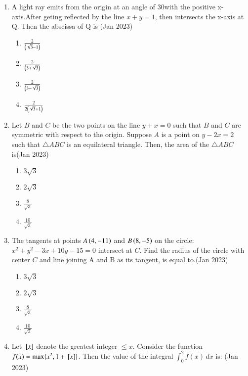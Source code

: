 \documentclass[journal,12pt,onecolumn]{IEEEtran}
\theoremstyle{remark}
\begin{document}
\begin{enumerate}
\item A light ray emits from the origin at an angle of 30\degree  with the positive x-axis.After geting reflected by the line $x + y = 1$, then intersects the x-axis at Q. Then the abscissa of Q is \hfill(Jan 2023)
\begin{multicols}{2}
\begin{enumerate}
    \item $\frac{2}{\left(\sqrt{3} - 1\right)}$\\
     \item $\frac{2}{\left(3 + \sqrt{3}\right)}$
     \item $\frac{2}{\left(3 - \sqrt{3}\right)}$\\
     \item $\frac{2}{2\left(\sqrt{3} + 1\right)}$
\end{enumerate}
\end{multicols}
\item Let $B$ and $C$ be the two points on the line $y + x = 0$
such that $B$ and $C$ are symmetric with respect to the origin. Suppose $A$ is a point on $y - 2x = 2$ such that $\triangle ABC$ is an equilateral triangle. Then, the area of the $\triangle ABC$ is\hfill(Jan 2023)
\begin{multicols}{4}
\begin{enumerate}
    \item $3\sqrt{3}$
   \item $2\sqrt{3}$
   \item $\frac{8}{\sqrt{3}}$
   \item $\frac{10}{\sqrt{3}}$
\end{enumerate}
\end{multicols}
\item The tangents at points  $A\left(4, -11\right)$ and $B\left(8, -5\right)$ on the circle:$x^2 + y^2 - 3x + 10y - 15 = 0$ intersect at $C$. Find the radius of the circle with center $C$ and line joining A and B as its
tangent, is equal to.\hfill(Jan 2023)
\begin{multicols}{4}
\begin{enumerate}
    \item $3\sqrt{3}$
   \item $2\sqrt{3}$
   \item $\frac{8}{\sqrt{3}}$
   \item $\frac{10}{\sqrt{3}}$
\end{enumerate}
\end{multicols}
\item Let ${}\left[x\right]$ denote the greatest integer $\leq x$. Consider the function $f(x) = \max \{x^2, 1 + {}\left[x\right]\}$. Then the value of the integral $\int_0^2 f(x)\,dx$ is: \hfill (Jan 2023)

\end{enumerate}
\end{document}
